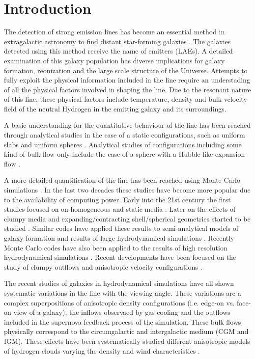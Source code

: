 \documentclass[usenatbib]{mn2e}
\newcommand{\ly}{{\ifmmode{{\rm Ly}\alpha~}\else{Ly$\alpha$~}\fi}}
\begin{document}
\section{Introduction}
\label{sec:intro}

The detection of strong \ly emission lines has become an essential
method in extragalactic astronomy to find distant star-forming
galaxies
\citep{PartridgePeebles,Rhoads00,Gawiser2007,Koehler2007,Ouchi08,Yamada2012,Schenker2012}.
The galaxies detected using this method receive the 
name of \ly emitters (LAEs). A detailed examination of this galaxy
population has diverse implications for galaxy formation, reonization
and the large scale structure of the Universe. Attempts to fully
exploit the physical information included in the \ly line require an
understading of all the physical factors involved in shaping the
line. Due to the resonant nature of this line, these physical factors
include temperature, density and bulk velocity field of the neutral
Hydrogen in the emitting galaxy and its surroundings.


A basic understanding for the quantitative behaviour of the \ly line
has been reached through analytical studies in the case of a static
configurations, such as uniform slabs
\citep{Harrington73,Neufeld90} and  uniform spheres
\citep{Dijkstra06}. Analytical studies of configurations including
some kind of bulk flow only include the case of a sphere with a Hubble
like expansion flow \citep{LoebRybicki}. 

A more detailed quantification of the \ly line has been reached using
Monte Carlo simulations \citep{Auer68,Avery68,Adams72}. In the last
two decades these studies have become more popular due to the
availability of computing power. Early into the 21st century the first
studies focused on on homogeneous and static media
\citep{Ahn00,Ahn01,Zheng02}. Later on the effects of clumpy media
\citep{Hansen06} and expanding/contracting shell/spherical geometries started to
be studied \citep{Verhamme06,Dijkstra06}. Similar codes have applied
these results to semi-analytical models of galaxy formation \citep{Orsi12} and
results of large hydrodynamical simulations
\citep{CLARA,Forero12,Behrens13}. Recently Monte Carlo codes have also
been applied to the results of high resolution hydrodynamical
simulations \citep{Laursen09,Barnes11,Verhamme12,Yajima12}. Recent developments have been
focused on the study of clumpy outflows \citep{DijkstraKramer}and
anisotropic velocity configurations \citep{Zheng2013}.

The recent studies of galaxies in hydrodynamical simulations
\citep{Laursen09,Barnes11,Verhamme12,Yajima12} have all shown
systematic variations in the \ly line with the viewing angle. These
variations are a complex superpositions of anisotropic density
configurations (i.e. edge-on vs. face-on view of a galaxy), the
inflows observaed by gas cooling and the outflows included in the
supernova feedback process of the simulation. These bulk flows
physically correspond to the circumgalactic and intergalactic medium
(CGM and IGM). These effects have been systematically studied
different anisotropic models of hydrogen clouds  varying the density
and wind characteristics \citep{Zheng2013}.
\end{document}

